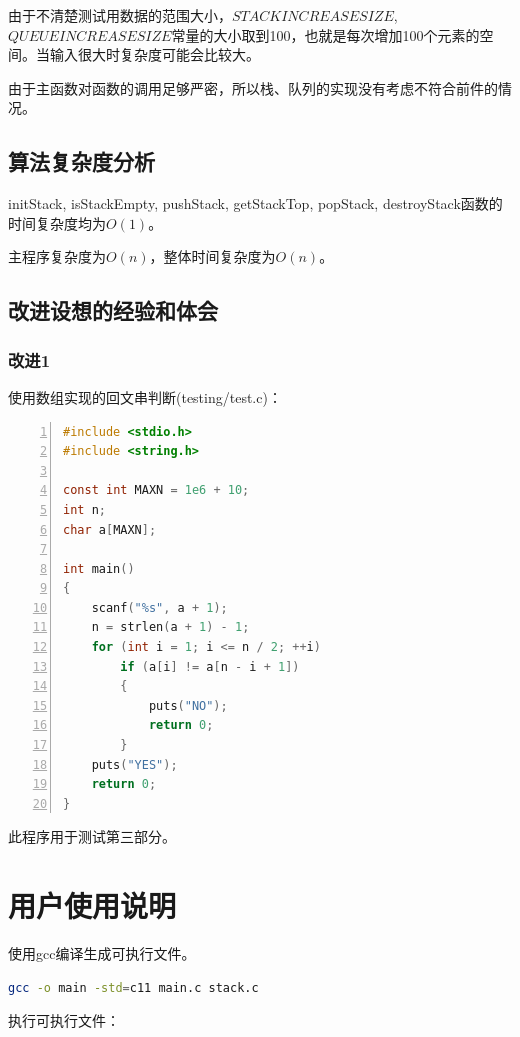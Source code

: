 \documentclass{article}
\begin{document}
由于不清楚测试用数据的范围大小，$STACKINCREASESIZE$,$QUEUEINCREASESIZE$常量的大小取到100，也就是每次增加100个元素的空间。当输入很大时复杂度可能会比较大。

由于主函数对函数的调用足够严密，所以栈、队列的实现没有考虑不符合前件的情况。

\subsection{算法复杂度分析}

initStack, isStackEmpty, pushStack, getStackTop, popStack, destroyStack函数的时间复杂度均为$O(1)$。

主程序复杂度为$O(n)$，整体时间复杂度为$O(n)$。

\subsection{改进设想的经验和体会}

\subsubsection{改进1}

使用数组实现的回文串判断(testing/test.c)：

\begin{lstlisting}[language={C},
    numbers=left,
    numberstyle=\tiny\consolas,
    basicstyle=\small\consolas]
#include <stdio.h>
#include <string.h>

const int MAXN = 1e6 + 10;
int n;
char a[MAXN];

int main()
{
    scanf("%s", a + 1);
    n = strlen(a + 1) - 1;
    for (int i = 1; i <= n / 2; ++i)
        if (a[i] != a[n - i + 1])
        {
            puts("NO");
            return 0;
        }
    puts("YES");
    return 0;
}
\end{lstlisting}

此程序用于测试第三部分。

\section{用户使用说明}

使用gcc编译生成可执行文件。

\begin{lstlisting}[language={bash},
    basicstyle=\small\consolas]
gcc -o main -std=c11 main.c stack.c
\end{lstlisting}

执行可执行文件：
\end{document}
